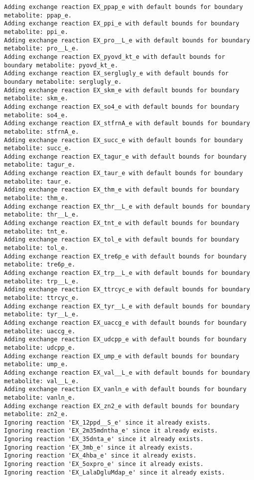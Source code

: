 \documentclass[
  letterpaper,
  DIV=11,
  numbers=noendperiod]{scrartcl}
\begin{document}
\begin{verbatim}
Adding exchange reaction EX_ppap_e with default bounds for boundary metabolite: ppap_e.
Adding exchange reaction EX_ppi_e with default bounds for boundary metabolite: ppi_e.
Adding exchange reaction EX_pro__L_e with default bounds for boundary metabolite: pro__L_e.
Adding exchange reaction EX_pyovd_kt_e with default bounds for boundary metabolite: pyovd_kt_e.
Adding exchange reaction EX_serglugly_e with default bounds for boundary metabolite: serglugly_e.
Adding exchange reaction EX_skm_e with default bounds for boundary metabolite: skm_e.
Adding exchange reaction EX_so4_e with default bounds for boundary metabolite: so4_e.
Adding exchange reaction EX_stfrnA_e with default bounds for boundary metabolite: stfrnA_e.
Adding exchange reaction EX_succ_e with default bounds for boundary metabolite: succ_e.
Adding exchange reaction EX_tagur_e with default bounds for boundary metabolite: tagur_e.
Adding exchange reaction EX_taur_e with default bounds for boundary metabolite: taur_e.
Adding exchange reaction EX_thm_e with default bounds for boundary metabolite: thm_e.
Adding exchange reaction EX_thr__L_e with default bounds for boundary metabolite: thr__L_e.
Adding exchange reaction EX_tnt_e with default bounds for boundary metabolite: tnt_e.
Adding exchange reaction EX_tol_e with default bounds for boundary metabolite: tol_e.
Adding exchange reaction EX_tre6p_e with default bounds for boundary metabolite: tre6p_e.
Adding exchange reaction EX_trp__L_e with default bounds for boundary metabolite: trp__L_e.
Adding exchange reaction EX_ttrcyc_e with default bounds for boundary metabolite: ttrcyc_e.
Adding exchange reaction EX_tyr__L_e with default bounds for boundary metabolite: tyr__L_e.
Adding exchange reaction EX_uaccg_e with default bounds for boundary metabolite: uaccg_e.
Adding exchange reaction EX_udcpp_e with default bounds for boundary metabolite: udcpp_e.
Adding exchange reaction EX_ump_e with default bounds for boundary metabolite: ump_e.
Adding exchange reaction EX_val__L_e with default bounds for boundary metabolite: val__L_e.
Adding exchange reaction EX_vanln_e with default bounds for boundary metabolite: vanln_e.
Adding exchange reaction EX_zn2_e with default bounds for boundary metabolite: zn2_e.
Ignoring reaction 'EX_12ppd__S_e' since it already exists.
Ignoring reaction 'EX_2m35mdntha_e' since it already exists.
Ignoring reaction 'EX_35dnta_e' since it already exists.
Ignoring reaction 'EX_3mb_e' since it already exists.
Ignoring reaction 'EX_4hba_e' since it already exists.
Ignoring reaction 'EX_5oxpro_e' since it already exists.
Ignoring reaction 'EX_LalaDgluMdap_e' since it already exists.

\end{verbatim}
\end{document}
